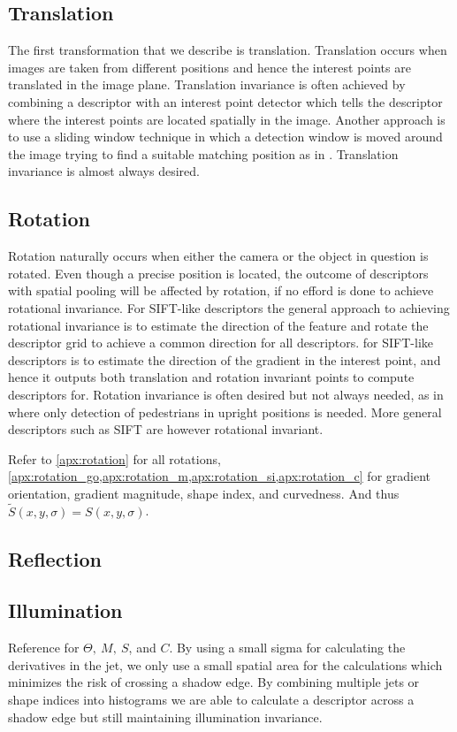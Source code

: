 \documentclass[thesis.tex]{subfiles}
\begin{document}
\subsection{Translation}
The first transformation that we describe is translation. Translation occurs when images are taken from different positions and hence the interest points are translated in the image plane. Translation invariance is often achieved by combining a descriptor with an interest point detector which tells the descriptor where the interest points are located spatially in the image. Another approach is to use a sliding window technique in which a detection window is moved around the image trying to find a suitable matching position as in \cite{felzenszwalb2008discriminatively}. Translation invariance is almost always desired.


\subsection{Rotation}
Rotation naturally occurs when either the camera or the object in question is rotated. Even though a precise position is located, the outcome of descriptors with spatial pooling will be affected by rotation, if no efford is done to achieve rotational invariance. For SIFT-like descriptors the general approach to achieving rotational invariance is to estimate the direction of the feature and rotate the descriptor grid to achieve a common direction for all descriptors. for SIFT-like descriptors is to estimate the direction of the gradient in the interest point, and hence it outputs both translation and rotation invariant points to compute descriptors for. Rotation invariance is often desired but not always needed, as in \cite{dalal2005histograms,felzenszwalb2008discriminatively} where only detection of pedestrians in upright positions is needed. More general descriptors such as SIFT are however rotational invariant.

Refer to \cref{apx:rotation} for all rotations, \cref{apx:rotation_go,apx:rotation_m,apx:rotation_si,apx:rotation_c} for gradient orientation, gradient magnitude, shape index, and curvedness.
%
And thus $\widetilde{S}(x,y,\sigma) = S(x,y,\sigma)$.
%
\subsection{Reflection}

\subsection{Illumination}
\label{sec:illumination}
Reference  for $\Theta,~M,~S$, and $C$.
By using a small sigma for calculating the derivatives in the jet, we only use a small spatial area for the calculations which minimizes the risk of crossing a shadow edge. By combining multiple jets or shape indices into histograms we are able to calculate a descriptor across a shadow edge but still maintaining illumination invariance.
\end{document}
